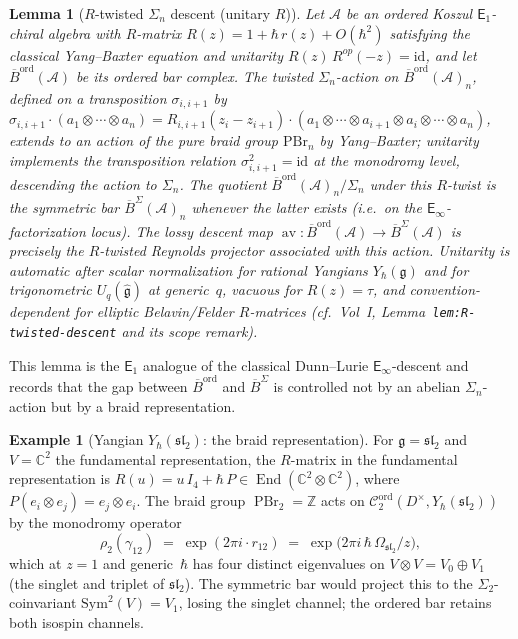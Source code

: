 \documentclass[11pt,reqno]{amsart}
\newtheorem{lemma}[theorem]{Lemma}
\theoremstyle{definition}
\newtheorem{example}[theorem]{Example}
\theoremstyle{remark}
\newcommand{\cA}{\mathcal{A}}
\newcommand{\cC}{\mathcal{C}}
\newcommand{\Eone}{\mathsf{E}_{1}}
\newcommand{\Einf}{\mathsf{E}_{\infty}}
\newcommand{\Sym}{\mathrm{Sym}}
\DeclareMathOperator{\End}{End}
\DeclareMathOperator{\av}{av}
\DeclareMathOperator{\PBr}{PBr}
\newcommand{\fg}{\mathfrak{g}}
\newcommand{\Barord}{\overline{B}^{\mathrm{ord}}}
\newcommand{\BarSig}{\overline{B}^{\Sigma}}
\newcommand{\CC}{\mathbb{C}}
\newcommand{\ZZ}{\mathbb{Z}}
\newcommand{\id}{\mathrm{id}}
\numberwithin{equation}{section}
\begin{document}
\begin{lemma}[$R$-twisted $\Sigma_n$ descent (unitary $R$)]
\label{lem:R-twisted-descent-sa}
Let $\cA$ be an ordered Koszul $\Eone$-chiral algebra with
$R$-matrix $R(z) = 1 + \hbar\,r(z) + O(\hbar^2)$ satisfying the
classical Yang--Baxter equation \emph{and} unitarity
$R(z)\,R^{op}(-z) = \id$, and let
$\Barord(\cA)$ be its ordered bar complex. The twisted
$\Sigma_n$-action on $\Barord(\cA)_n$, defined on a transposition
$\sigma_{i,i+1}$ by
$\sigma_{i,i+1}\cdot(a_1\otimes\cdots\otimes a_n)
= R_{i,i+1}(z_i-z_{i+1})\cdot(a_1\otimes\cdots\otimes a_{i+1}\otimes a_i\otimes\cdots\otimes a_n)$,
extends to an action of the pure braid group $\mathrm{PBr}_n$ by
Yang--Baxter; unitarity implements the transposition relation
$\sigma_{i,i+1}^2 = \id$ at the monodromy level, descending the
action to $\Sigma_n$. The quotient
$\Barord(\cA)_n/\Sigma_n$ under this $R$-twist is the symmetric bar
$\BarSig(\cA)_n$ whenever the latter exists \textup{(}i.e.\ on
the $\Einf$-factorization locus\textup{)}. The lossy descent
map $\av\colon\Barord(\cA) \to \BarSig(\cA)$ is precisely the
$R$-twisted Reynolds projector associated with this action.
Unitarity is automatic after scalar normalization for rational
Yangians $Y_\hbar(\fg)$ and for trigonometric
$U_q(\widehat{\fg})$ at generic~$q$, vacuous for $R(z)=\tau$, and
convention-dependent for elliptic Belavin/Felder $R$-matrices
(cf.\ Vol~I, Lemma~\texttt{lem:R-twisted-descent} and its
scope remark).
\end{lemma}

This lemma is the $\Eone$ analogue of the classical
Dunn--Lurie $\Einf$-descent and records that the gap between
$\Barord$ and $\BarSig$ is controlled not by an abelian
$\Sigma_n$-action but by a braid representation.

\begin{example}[Yangian $Y_\hbar(\mathfrak{sl}_2)$:
the braid representation]
\label{ex:yangian-braid}
For $\fg = \mathfrak{sl}_2$ and $V = \CC^2$ the fundamental
representation, the $R$-matrix in the fundamental
representation is $R(u) = u\,I_4 + \hbar\,P \in \End(\CC^2
\otimes \CC^2)$, where $P(e_i \otimes e_j) = e_j \otimes e_i$.
The braid group $\PBr_2 = \ZZ$ acts on
$\cC_2^{\mathrm{ord}}(D^\times, Y_\hbar(\mathfrak{sl}_2))$
by the monodromy operator
\[
  \rho_2(\gamma_{12})
  \;=\;
  \exp(2\pi i \cdot r_{12})
  \;=\;
  \exp\!\bigl(2\pi i\,\hbar\,\Omega_{\mathfrak{sl}_2}/z\bigr),
\]
which at $z = 1$ and generic~$\hbar$ has four distinct eigenvalues
on $V \otimes V = V_0 \oplus V_1$ (the singlet and triplet of
$\mathfrak{sl}_2$). The symmetric bar would project this to the
$\Sigma_2$-coinvariant $\Sym^2(V) = V_1$, losing the singlet
channel; the ordered bar retains both isospin channels.
\end{example}
\end{document}
